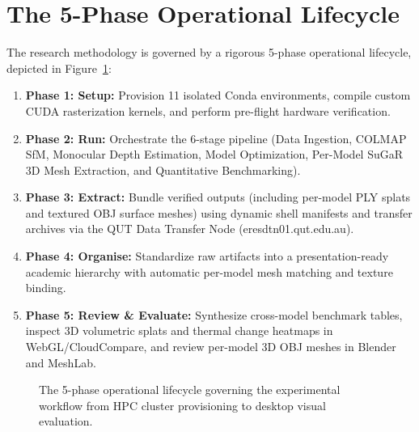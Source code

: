 \section{The 5-Phase Operational Lifecycle}
\label{sec:lifecycle}
The research methodology is governed by a rigorous 5-phase operational lifecycle, depicted in Figure~\ref{fig:lifecycle_diagram}:
\begin{enumerate}
    \item \textbf{Phase 1: Setup:} Provision 11 isolated Conda environments, compile custom CUDA rasterization kernels, and perform pre-flight hardware verification.
    \item \textbf{Phase 2: Run:} Orchestrate the 6-stage pipeline (Data Ingestion, COLMAP SfM, Monocular Depth Estimation, Model Optimization, Per-Model SuGaR 3D Mesh Extraction, and Quantitative Benchmarking).
    \item \textbf{Phase 3: Extract:} Bundle verified outputs (including per-model PLY splats and textured OBJ surface meshes) using dynamic shell manifests and transfer archives via the QUT Data Transfer Node (eresdtn01.qut.edu.au).
    \item \textbf{Phase 4: Organise:} Standardize raw artifacts into a presentation-ready academic hierarchy with automatic per-model mesh matching and texture binding.
    \item \textbf{Phase 5: Review \& Evaluate:} Synthesize cross-model benchmark tables, inspect 3D volumetric splats and thermal change heatmaps in WebGL/CloudCompare, and review per-model 3D OBJ meshes in Blender and MeshLab.
\end{enumerate}

\begin{figure}[htbp]
    \centering
    \caption{The 5-phase operational lifecycle governing the experimental workflow from HPC cluster provisioning to desktop visual evaluation.}
    \label{fig:lifecycle_diagram}
\end{figure}


